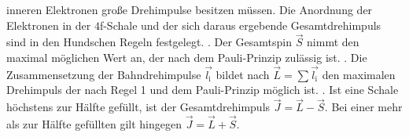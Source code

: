 inneren Elektronen große Drehimpulse besitzen müssen. Die Anordnung der Elektronen in der $4$f-Schale und der sich daraus ergebende Gesamtdrehimpuls sind in den Hundschen Regeln
festgelegt. 
\newline {}. Der Gesamtspin $\vec{S}$ nimmt den maximal möglichen Wert an, der nach dem Pauli-Prinzip zulässig ist. 
. Die Zusammensetzung der Bahndrehimpulse $\vec{l_\text{i}}$ bildet nach $\vec{L} = \sum \vec{l_\text{i}}$ den maximalen Drehimpuls der nach Regel 1 und dem Pauli-Prinzip möglich ist.
. Ist eine Schale höchstens zur Hälfte gefüllt, ist der Gesamtdrehimpuls $\vec{J} = \vec{L} - \vec{S}$. Bei einer mehr als zur Hälfte gefüllten gilt hingegen
$\vec{J} = \vec{L} + \vec{S}$.

